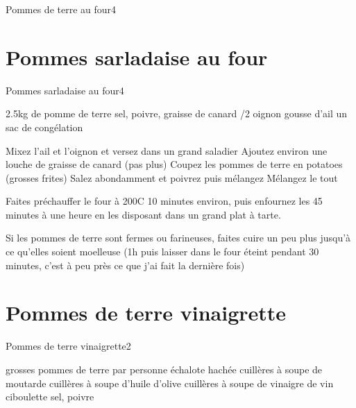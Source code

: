 {\begin{recette}{Pommes de terre au four}{4}{}{}
\begin{cuisson}



\end{cuisson}
\end{recette}


\section{Pommes sarladaise au four}
\begin{recette}{Pommes sarladaise au four}{4}{}{}
\begin{ingredients}
\ingredient 2.5kg de pomme de terre
\ingredient sel, poivre, graisse de canard
/2 oignon
 gousse d'ail
\ingredient un sac de congélation
\end{ingredients}

\begin{preparation}
\etape Mixez l'ail et l'oignon et versez dans un grand saladier
\etape Ajoutez environ une louche de graisse de canard (pas plus)
\etape Coupez les pommes de terre en potatoes (grosses frites)
\etape Salez abondamment et poivrez puis mélangez
\etape Mélangez le tout
\end{preparation}

\begin{cuisson}
Faites préchauffer le four à 200\degres C 10 minutes environ, puis enfournez les 45 minutes à une heure en les disposant dans un grand plat 
à tarte.

Si les pommes de terre sont fermes ou farineuses, faites cuire un peu plus jusqu'à ce qu'elles soient moelleuse (1h puis laisser dans le four éteint pendant 30 minutes, c'est à peu près ce que j'ai fait la dernière fois)
\end{cuisson}
\end{recette}

\section{Pommes de terre vinaigrette}
\begin{recette}{Pommes de terre vinaigrette}{2}{}{}
\begin{ingredients}
 grosses pommes de terre par personne
 échalote hachée
 cuillères à soupe de moutarde
 cuillères à soupe d'huile d'olive
 cuillères à soupe de vinaigre de vin
\ingredient ciboulette
\ingredient sel, poivre
\end{ingredients}


\end{recette}}
